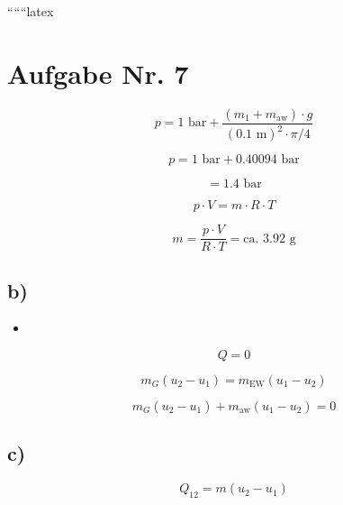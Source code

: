 
``````latex


\section*{Aufgabe Nr. 7}

\begin{equation*}
p = 1 \text{ bar} + \frac{(m_{1} + m_{\text{aw}}) \cdot g}{\left(0.1 \text{ m}\right)^2 \cdot \pi / 4}
\end{equation*}

\begin{equation*}
p = 1 \text{ bar} + 0.40094 \text{ bar}
\end{equation*}

\begin{equation*}
= 1.4 \text{ bar}
\end{equation*}

\begin{equation*}
p \cdot V = m \cdot R \cdot T
\end{equation*}

\begin{equation*}
m = \frac{p \cdot V}{R \cdot T} = \text{ca. } 3.92 \text{ g}
\end{equation*}

\subsection*{b)}

\begin{itemize}
    \item {}
\end{itemize}

\begin{equation*}
Q = 0
\end{equation*}

\begin{equation*}
m_{G} (u_{2} - u_{1}) = m_{\text{EW}} (u_{1} - u_{2})
\end{equation*}

\begin{equation*}
m_{G} (u_{2} - u_{1}) + m_{\text{aw}} (u_{1} - u_{2}) = 0
\end{equation*}

\subsection*{c)}

\begin{equation*}
Q_{12} = m (u_{2} - u_{1})
\end{equation*}

